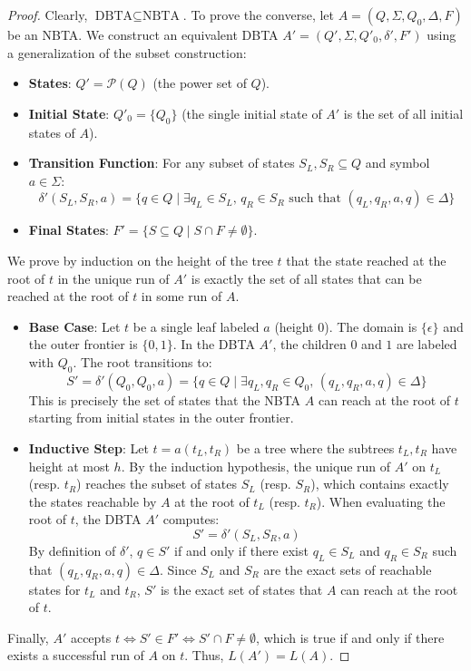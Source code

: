 \begin{proof}
Clearly, $\text{DBTA} \subseteq \text{NBTA}$. To prove the converse, let $A = (Q, \Sigma, Q_0, \Delta, F)$ be an NBTA. We construct an equivalent DBTA $A' = (Q', \Sigma, Q'_0, \delta', F')$ using a generalization of the subset construction:
\begin{itemize}
    \item \textbf{States}: $Q' = \mathcal{P}(Q)$ (the power set of $Q$).
    \item \textbf{Initial State}: $Q'_0 = \{ Q_0 \}$ (the single initial state of $A'$ is the set of all initial states of $A$).
    \item \textbf{Transition Function}: For any subset of states $S_L, S_R \subseteq Q$ and symbol $a \in \Sigma$:
    $$\delta'(S_L, S_R, a) = \{ q \in Q \mid \exists q_L \in S_L, \, q_R \in S_R \text{ such that } (q_L, q_R, a, q) \in \Delta \}$$
    \item \textbf{Final States}: $F' = \{ S \subseteq Q \mid S \cap F \neq \emptyset \}$.
\end{itemize}
We prove by induction on the height of the tree $t$ that the state reached at the root of $t$ in the unique run of $A'$ is exactly the set of all states that can be reached at the root of $t$ in some run of $A$.
\begin{itemize}
    \item \textbf{Base Case}: Let $t$ be a single leaf labeled $a$ (height 0). The domain is $\{\epsilon\}$ and the outer frontier is $\{0, 1\}$. 
    In the DBTA $A'$, the children $0$ and $1$ are labeled with $Q_0$. The root transitions to:
    $$S' = \delta'(Q_0, Q_0, a) = \{ q \in Q \mid \exists q_L, q_R \in Q_0, \, (q_L, q_R, a, q) \in \Delta \}$$
    This is precisely the set of states that the NBTA $A$ can reach at the root of $t$ starting from initial states in the outer frontier.
    
    \item \textbf{Inductive Step}: Let $t = a(t_L, t_R)$ be a tree where the subtrees $t_L, t_R$ have height at most $h$.
    By the induction hypothesis, the unique run of $A'$ on $t_L$ (resp. $t_R$) reaches the subset of states $S_L$ (resp. $S_R$), which contains exactly the states reachable by $A$ at the root of $t_L$ (resp. $t_R$).
    When evaluating the root of $t$, the DBTA $A'$ computes:
    $$S' = \delta'(S_L, S_R, a)$$
    By definition of $\delta'$, $q \in S'$ if and only if there exist $q_L \in S_L$ and $q_R \in S_R$ such that $(q_L, q_R, a, q) \in \Delta$. Since $S_L$ and $S_R$ are the exact sets of reachable states for $t_L$ and $t_R$, $S'$ is the exact set of states that $A$ can reach at the root of $t$.
\end{itemize}
Finally, $A'$ accepts $t \iff S' \in F' \iff S' \cap F \neq \emptyset$, which is true if and only if there exists a successful run of $A$ on $t$. Thus, $L(A') = L(A)$.
\end{proof}

